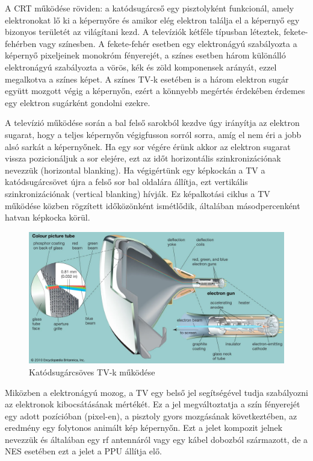 	A CRT működése röviden: a katódsugárcső egy pisztolyként funkcionál, amely elektronokat lő ki a képernyőre és amikor elég elektron találja el a képernyő egy bizonyos területét az világítani kezd. A televíziók kétféle típusban léteztek, fekete-fehérben vagy színesben. A fekete-fehér esetben egy elektronágyú szabályozta a képernyő pixeljeinek monokróm fényerejét, a színes esetben három különálló elektronágyú szabályozta a vörös, kék és zöld komponensek arányát, ezzel megalkotva a színes képet. A színes TV-k esetében is a három elektron sugár együtt mozgott végig a képernyőn, ezért a könnyebb megértés érdekében érdemes egy elektron sugárként gondolni ezekre. 
	
	A televízió működése során a bal felső sarokból kezdve úgy irányítja az elektron sugarat, hogy a teljes képernyőn végigfusson sorról sorra, amíg el nem éri a jobb alsó sarkát a képernyőnek. Ha egy sor végére érünk akkor az elektron sugarat vissza pozicionáljuk a sor elejére, ezt az időt horizontális szinkronizációnak nevezzük (horizontal blanking). Ha végigértünk egy képkockán a TV a katódsugárcsövet újra a felső sor bal oldalára állítja, ezt vertikális szinkronizációnak (vertical blanking) hívják. Ez képalkotási ciklus a TV működése közben rögzített időközönként ismétlődik, általában másodpercenként hatvan képkocka körül. 
	
	\begin{figure}[H]
		\centering
		\includegraphics[width=150mm, keepaspectratio]{figures/CRT-TV}
		\caption{Katódsugárcsöves TV-k működése}
		\label{fig:CRT-TV}
	\end{figure}
	
	Miközben a elektronágyú mozog, a TV egy belső jel segítségével tudja szabályozni az elektronok kibocsátásának mértékét. Ez a jel megváltoztatja a szín fényerejét egy adott pozícióban (pixel-en), a pisztoly gyors mozgásának következtében, az eredmény egy folytonos animált kép képernyőn. Ezt a jelet kompozit jelnek nevezzük és általában egy rf antennáról vagy egy kábel dobozból származott, de a NES esetében ezt a jelet a PPU állítja elő. 
	
